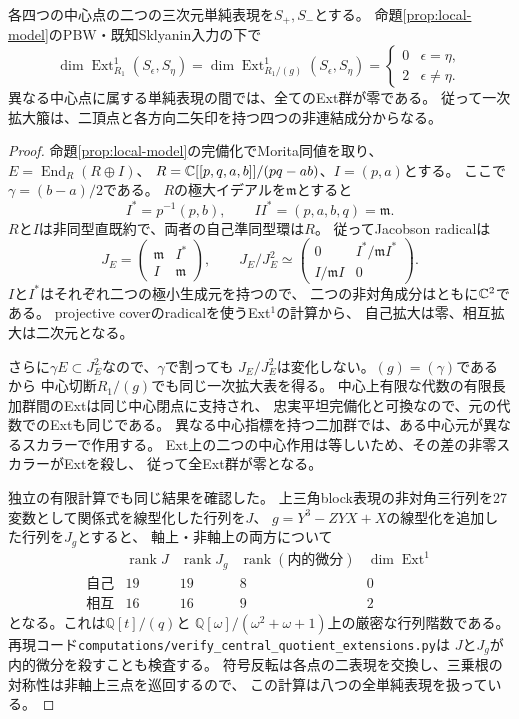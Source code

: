 \begin{proposition}[八つの三次元単純表現の一次拡大]
\label{prop:quotient-full-ext1}
各四つの中心点の二つの三次元単純表現を$S_+,S_-$とする。
命題\ref{prop:local-model}のPBW・既知Sklyanin入力の下で
\[
 \dim\operatorname{Ext}^1_{R_1}(S_\epsilon,S_\eta)
 =\dim\operatorname{Ext}^1_{R_1/(g)}(S_\epsilon,S_\eta)
 =\begin{cases}0&\epsilon=\eta,\\2&\epsilon\ne\eta.\end{cases}
\]
異なる中心点に属する単純表現の間では、全てのExt群が零である。
従って一次拡大箙は、二頂点と各方向二矢印を持つ四つの非連結成分からなる。
\end{proposition}
\begin{proof}
命題\ref{prop:local-model}の完備化でMorita同値を取り、
$E=\operatorname{End}_R(R\oplus I)$、
$R=\mathbb C[[p,q,a,b]]/(pq-ab)$、$I=(p,a)$とする。
ここで$\gamma=(b-a)/2$である。
$R$の極大イデアルを$\mathfrak m$とすると
\[
 I^*=p^{-1}(p,b),\qquad II^*=(p,a,b,q)=\mathfrak m.
\]
$R$と$I$は非同型直既約で、両者の自己準同型環は$R$。
従ってJacobson radicalは
\[
 J_E=\begin{pmatrix}\mathfrak m&I^*\\I&\mathfrak m\end{pmatrix},\qquad
 J_E/J_E^2\simeq
 \begin{pmatrix}0&I^*/\mathfrak m I^*\\I/\mathfrak m I&0\end{pmatrix}.
\]
$I$と$I^*$はそれぞれ二つの極小生成元を持つので、
二つの非対角成分はともに$\mathbb C^2$である。
projective coverのradicalを使うExt$^1$の計算から、
自己拡大は零、相互拡大は二次元となる。

さらに$\gamma E\subset J_E^2$なので、$\gamma$で割っても
$J_E/J_E^2$は変化しない。$(g)=(\gamma)$であるから
中心切断$R_1/(g)$でも同じ一次拡大表を得る。
中心上有限な代数の有限長加群間のExtは同じ中心閉点に支持され、
忠実平坦完備化と可換なので、元の代数でのExtも同じである。
異なる中心指標を持つ二加群では、ある中心元が異なるスカラーで作用する。
Ext上の二つの中心作用は等しいため、その差の非零スカラーがExtを殺し、
従って全Ext群が零となる。

独立の有限計算でも同じ結果を確認した。
上三角block表現の非対角三行列を27変数として関係式を線型化した行列を$J$、
$g=Y^3-ZYX+X$の線型化を追加した行列を$J_g$とすると、
軸上・非軸上の両方について
\[
\begin{array}{c|c|c|c|c}
 &\operatorname{rank}J&\operatorname{rank}J_g
 &\operatorname{rank}(\text{内的微分})&\dim\operatorname{Ext}^1\\\hline
 \text{自己}&19&19&8&0\\
 \text{相互}&16&16&9&2
\end{array}
\]
となる。これは$\mathbb Q[t]/(q)$と
$\mathbb Q[\omega]/(\omega^2+\omega+1)$上の厳密な行列階数である。
再現コード\texttt{computations/verify\_central\_quotient\_extensions.py}は
$J$と$J_g$が内的微分を殺すことも検査する。
符号反転は各点の二表現を交換し、三乗根の対称性は非軸上三点を巡回するので、
この計算は八つの全単純表現を扱っている。
\end{proof}

